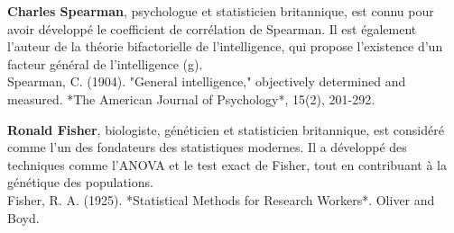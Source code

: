 \begin{thebibliography}{9}
\textbf{Charles Spearman}, psychologue et statisticien britannique, est connu pour avoir développé le coefficient de corrélation de Spearman. Il est également l’auteur de la théorie bifactorielle de l'intelligence, qui propose l’existence d’un facteur général de l'intelligence (g).\\
Spearman, C. (1904). "General intelligence," objectively determined and measured. *The American Journal of Psychology*, 15(2), 201-292.

\textbf{Ronald Fisher}, biologiste, généticien et statisticien britannique, est considéré comme l'un des fondateurs des statistiques modernes. Il a développé des techniques comme l'ANOVA et le test exact de Fisher, tout en contribuant à la génétique des populations.\\
Fisher, R. A. (1925). *Statistical Methods for Research Workers*. Oliver and Boyd.

\end{thebibliography} 


